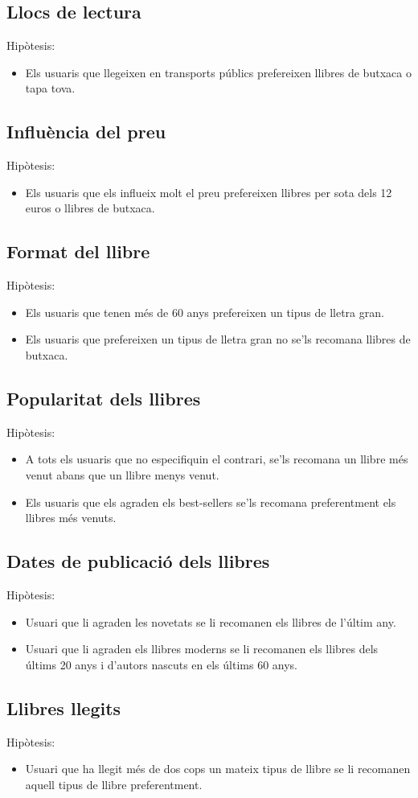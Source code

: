 \subsection{Llocs de lectura}
Hipòtesis:
\begin{itemize}
  \item Els usuaris que llegeixen en transports públics prefereixen llibres de butxaca o tapa tova.
\end{itemize}

\subsection{Influència del preu}
Hipòtesis:
\begin{itemize}
  \item Els usuaris que els influeix molt el preu prefereixen llibres per sota dels 12 euros o llibres de butxaca.
\end{itemize}

\subsection{Format del llibre}
Hipòtesis:
\begin{itemize}
  \item Els usuaris que tenen més de 60 anys prefereixen un tipus de lletra gran.
  \item Els usuaris que prefereixen un tipus de lletra gran no se'ls recomana llibres de butxaca.
\end{itemize}

\subsection{Popularitat dels llibres}
Hipòtesis:
\begin{itemize}
  \item A tots els usuaris que no especifiquin el contrari, se'ls recomana un llibre més venut abans que un llibre menys venut.
  \item Els usuaris que els agraden els best-sellers se'ls recomana preferentment els llibres més venuts.
\end{itemize}

\subsection{Dates de publicació dels llibres}
Hipòtesis:
\begin{itemize}
  \item Usuari que li agraden les novetats se li recomanen els llibres de l'últim any.
  \item Usuari que li agraden els llibres moderns se li recomanen els llibres dels  últims 20 anys i d'autors nascuts en els últims 60 anys.
\end{itemize}

\subsection{Llibres llegits}
Hipòtesis:
\begin{itemize}
  \item Usuari que ha llegit més de dos cops un mateix tipus de llibre se li recomanen aquell tipus de llibre preferentment.
\end{itemize}




